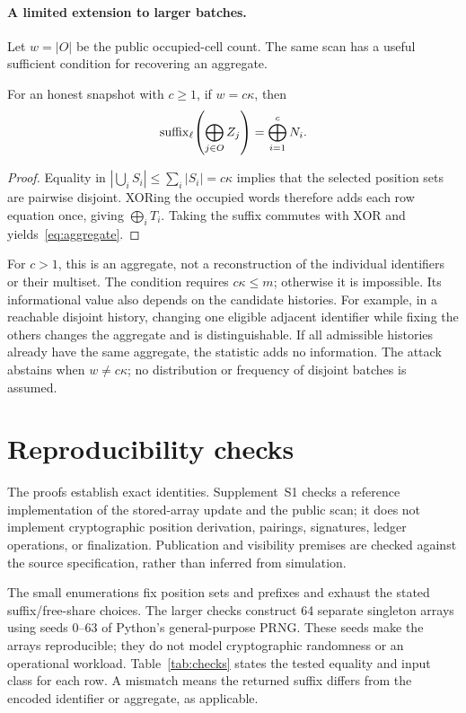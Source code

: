 \paragraph{A limited extension to larger batches.}
Let $w=|O|$ be the public occupied-cell count. The same scan has a useful
sufficient condition for recovering an aggregate.

\begin{proposition}
\label{prop:disjoint}
For an honest snapshot with $c\geq1$, if $w=c\kappa$, then
\begin{equation}
 \operatorname{suffix}_\ell\!\left(\bigoplus_{j\in O}Z_j\right)
       =\bigoplus_{i=1}^{c}N_i.
 \label{eq:aggregate}
\end{equation}
\end{proposition}

\begin{proof}
Equality in
$|\bigcup_i S_i|\leq\sum_i|S_i|=c\kappa$ implies that the selected position
sets are pairwise disjoint. XORing the occupied words therefore adds each
row equation once, giving $\bigoplus_i T_i$. Taking the suffix commutes
with XOR and yields~\eqref{eq:aggregate}.
\end{proof}

For $c>1$, this is an aggregate, not a reconstruction of the individual
identifiers or their multiset. The condition requires $c\kappa\leq m$;
otherwise it is impossible. Its informational value also depends on the
candidate histories. For example, in a reachable disjoint history, changing
one eligible adjacent identifier while fixing the others changes the aggregate
and is distinguishable. If all admissible histories already have the same
aggregate, the statistic adds no information. The attack abstains when
$w\ne c\kappa$; no distribution or frequency of disjoint batches is assumed.

\section{Reproducibility checks}

The proofs establish exact identities. Supplement~S1 checks a reference
implementation of the stored-array update and the public scan; it does not
implement cryptographic position derivation, pairings, signatures, ledger
operations, or finalization. Publication and visibility premises are checked
against the source specification, rather than inferred from simulation.

The small enumerations fix position sets and prefixes and exhaust the stated
suffix/free-share choices. The larger checks construct 64 separate singleton
arrays using seeds $0$--$63$ of Python's general-purpose PRNG. These seeds
make the arrays reproducible; they do not model cryptographic randomness or
an operational workload. Table~\ref{tab:checks} states the tested equality
and input class for each row. A mismatch means the returned suffix differs
from the encoded identifier or aggregate, as applicable.

